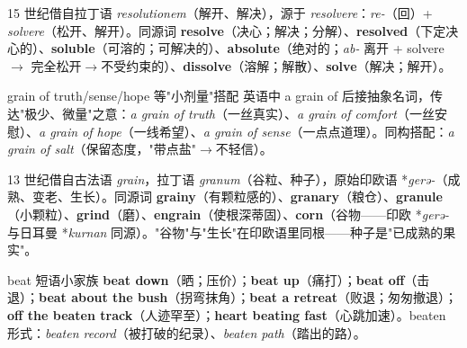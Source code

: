 \documentclass[../main.tex]{subfiles}
\begin{document}
\begin{origin}
15 世纪借自拉丁语 \textit{resolutionem}（解开、解决），源于 \textit{resolvere}：\textit{re-}（回）+ \textit{solvere}（松开、解开）。同源词 \textbf{resolve}（决心；解决；分解）、\textbf{resolved}（下定决心的）、\textbf{soluble}（可溶的；可解决的）、\textbf{absolute}（绝对的；\textit{ab-} 离开 + solvere $\to$ 完全松开$\to$不受约束的）、\textbf{dissolve}（溶解；解散）、\textbf{solve}（解决；解开）。
\end{origin}




\begin{gram}{grain of truth/sense/hope 等"小剂量"搭配}
英语中 a grain of 后接抽象名词，传达"极少、微量"之意：\textit{a grain of truth}（一丝真实）、\textit{a grain of comfort}（一丝安慰）、\textit{a grain of hope}（一线希望）、\textit{a grain of sense}（一点点道理）。同构搭配：\textit{a grain of salt}（保留态度，"带点盐"$\to$不轻信）。
\end{gram}

\begin{origin}
13 世纪借自古法语 \textit{grain}，拉丁语 \textit{granum}（谷粒、种子），原始印欧语 *\textit{gerə-}（成熟、变老、生长）。同源词 \textbf{grainy}（有颗粒感的）、\textbf{granary}（粮仓）、\textbf{granule}（小颗粒）、\textbf{grind}（磨）、\textbf{engrain}（使根深蒂固）、\textbf{corn}（谷物——印欧 *\textit{gerə-} 与日耳曼 *\textit{kurnan} 同源）。"谷物"与"生长"在印欧语里同根——种子是"已成熟的果实"。
\end{origin}



\begin{gram}{beat 短语小家族}
\textbf{beat down}（晒；压价）；\textbf{beat up}（痛打）；\textbf{beat off}（击退）；\textbf{beat about the bush}（拐弯抹角）；\textbf{beat a retreat}（败退；匆匆撤退）；\textbf{off the beaten track}（人迹罕至）；\textbf{heart beating fast}（心跳加速）。beaten 形式：\textit{beaten record}（被打破的纪录）、\textit{beaten path}（踏出的路）。
\end{gram}
\end{document}
